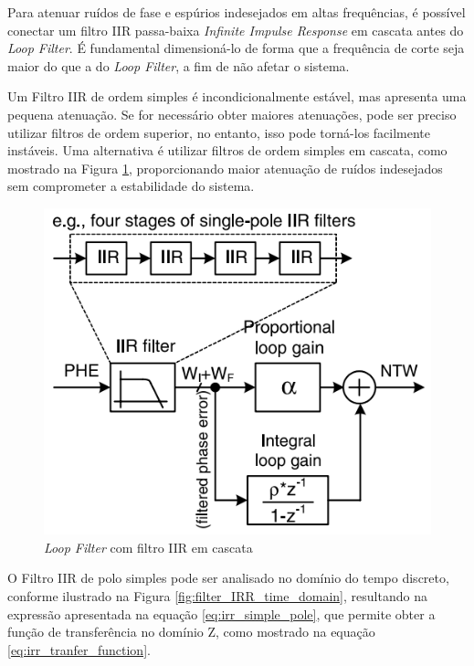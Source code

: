 Para atenuar ruídos de fase e espúrios indesejados em altas frequências, é possível conectar um filtro IIR passa-baixa \textit{Infinite Impulse Response} em cascata antes do \textit{Loop Filter}. É fundamental dimensioná-lo de forma que a frequência de corte seja maior do que a do \textit{Loop Filter}, a fim de não afetar o sistema.

Um Filtro IIR de ordem simples é incondicionalmente estável, mas apresenta uma pequena atenuação. Se for necessário obter maiores atenuações, pode ser preciso utilizar filtros de ordem superior, no entanto, isso pode torná-los facilmente instáveis. Uma alternativa é utilizar filtros de ordem simples em cascata, como mostrado na Figura \ref{fig:filter_IRR}, proporcionando maior atenuação de ruídos indesejados sem comprometer a estabilidade do sistema.
 
\begin{figure}[h!]
	\caption{\textit{Loop Filter} com filtro IIR em cascata}
	\begin{center}
		\includegraphics[scale=0.8]{img/filter_IRR.png}
	\end{center}
	\label{fig:filter_IRR}
\end{figure}

 O Filtro IIR de polo simples pode ser analisado no domínio do tempo discreto, conforme ilustrado na Figura \ref{fig:filter_IRR_time_domain}, resultando na expressão apresentada na equação \ref{eq:irr_simple_pole}, que permite obter a função de transferência no domínio Z, como mostrado na equação \ref{eq:irr_tranfer_function}.

